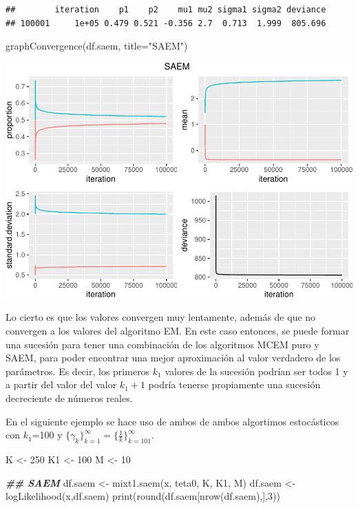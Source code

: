\documentclass[
]{article}
\newenvironment{Shaded}{\begin{snugshade}}{\end{snugshade}}
\newcommand{\AttributeTok}[1]{\textcolor[rgb]{0.77,0.63,0.00}{#1}}
\newcommand{\DecValTok}[1]{\textcolor[rgb]{0.00,0.00,0.81}{#1}}
\newcommand{\DocumentationTok}[1]{\textcolor[rgb]{0.56,0.35,0.01}{\textbf{\textit{#1}}}}
\newcommand{\FunctionTok}[1]{\textcolor[rgb]{0.00,0.00,0.00}{#1}}
\newcommand{\NormalTok}[1]{#1}
\newcommand{\OtherTok}[1]{\textcolor[rgb]{0.56,0.35,0.01}{#1}}
\newcommand{\StringTok}[1]{\textcolor[rgb]{0.31,0.60,0.02}{#1}}
\begin{document}
\begin{verbatim}
##        iteration    p1    p2    mu1 mu2 sigma1 sigma2 deviance
## 100001     1e+05 0.479 0.521 -0.356 2.7  0.713  1.999  805.696
\end{verbatim}

\begin{Shaded}
\begin{Highlighting}[]
\FunctionTok{graphConvergence}\NormalTok{(df.saem, }\AttributeTok{title=}\StringTok{"SAEM"}\NormalTok{)}
\end{Highlighting}
\end{Shaded}

\includegraphics{Reporte0108_files/figure-latex/unnamed-chunk-13-1.pdf}

Lo cierto es que los valores convergen muy lentamente, además de que no
convergen a los valores del algoritmo EM. En este caso entonces, se
puede formar una sucesión para tener una combinación de los algoritmos
MCEM puro y SAEM, para poder encontrar una mejor aproximación al valor
verdadero de los parámetros. Es decir, los primeros \(k_1\) valores de
la sucesión podrían ser todos 1 y a partir del valor del valor \(k_1+1\)
podría tenerse propiamente una sucesión decreciente de números reales.

En el siguiente ejemplo se hace uso de ambos de ambos algortimos
estocásticos con \(k_1\)=100 y
\(\{ \gamma_k \}_{k=1}^{\infty}=\{\frac{1}{k} \}_{k=101}^{\infty}\).

\begin{Shaded}
\begin{Highlighting}[]
\NormalTok{K }\OtherTok{\textless{}{-}} \DecValTok{250}
\NormalTok{K1 }\OtherTok{\textless{}{-}} \DecValTok{100}
\NormalTok{M }\OtherTok{\textless{}{-}} \DecValTok{10}

\DocumentationTok{\#\#  SAEM}
\NormalTok{df.saem }\OtherTok{\textless{}{-}} \FunctionTok{mixt1.saem}\NormalTok{(x, teta0, K, K1, M)}
\NormalTok{df.saem }\OtherTok{\textless{}{-}} \FunctionTok{logLikelihood}\NormalTok{(x,df.saem)}
\FunctionTok{print}\NormalTok{(}\FunctionTok{round}\NormalTok{(df.saem[}\FunctionTok{nrow}\NormalTok{(df.saem),],}\DecValTok{3}\NormalTok{))}
\end{Highlighting}
\end{Shaded}
\end{document}
